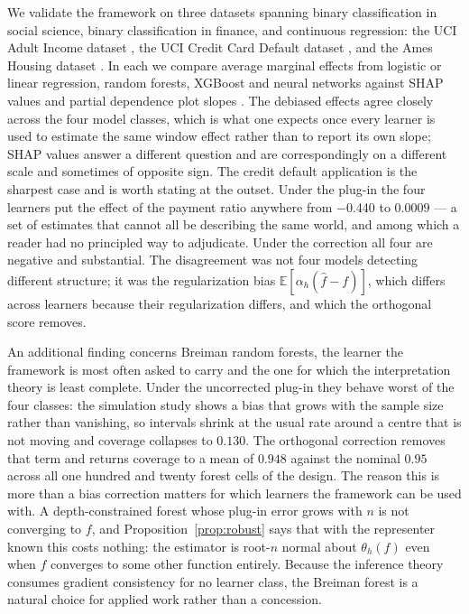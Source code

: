 \documentclass[12pt,a4paper]{article}
\numberwithin{equation}{section}
\theoremstyle{plain}
\theoremstyle{definition}
\newcommand{\E}{\mathbb{E}}
\begin{document}
	We validate the framework on three datasets spanning binary classification in
	social science, binary classification in finance, and continuous regression:
	the UCI Adult Income dataset \citep{kohavi1996, UCI}, the UCI Credit Card
	Default dataset \citep{yeh2009, UCI}, and the Ames Housing dataset
	\citep{decock2011}. In each we compare average marginal effects from logistic
	or linear regression, random forests, XGBoost \citep{chen2016xgboost} and
	neural networks against SHAP values \citep{lundberg2017shap} and partial
	dependence plot slopes \citep{friedman2001pdp}. The debiased effects agree
	closely across the four model classes, which is what one expects once every
	learner is used to estimate the same window effect rather than to report its
	own slope; SHAP values answer a different question and are correspondingly on
	a different scale and sometimes of opposite sign. The credit default
	application is the sharpest case and is worth stating at the outset. Under the
	plug-in the four learners put the effect of the payment ratio anywhere from
	$-$0.440 to $0.0009$ --- a set of estimates that cannot all be describing the
	same world, and among which a reader had no principled way to adjudicate.
	Under the correction all four are negative and substantial. The disagreement
	was not four models detecting different structure; it was the regularization
	bias $\E[\alpha_h(\hat{f} - f)]$, which differs across learners because their
	regularization differs, and which the orthogonal score removes.

	An additional finding concerns Breiman random forests, the learner the
	framework is most often asked to carry and the one for which the
	interpretation theory is least complete. Under the uncorrected plug-in they
	behave worst of the four classes: the simulation study shows a bias that grows
	with the sample size rather than vanishing, so intervals shrink at the usual
	rate around a centre that is not moving and coverage collapses to $0.130$. The
	orthogonal correction removes that term and returns coverage to a mean of
	$0.948$ against the nominal $0.95$ across all one hundred and twenty forest
	cells of the design. The reason this is more than a bias correction matters for
	which learners the framework can be used with. A depth-constrained forest whose
	plug-in error grows with $n$ is not converging to $f$, and
	Proposition~\ref{prop:robust} says that with the representer known this costs
	nothing: the estimator is root-$n$ normal about $\theta_h(f)$ even when
	$\hat{f}$ converges to some other function entirely. Because the inference
	theory consumes gradient consistency for no learner class, the Breiman forest
	is a natural choice for applied work rather than a concession.
\end{document}
